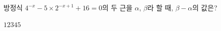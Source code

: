 방정식 $4^{-x}-5\times 2^{-x+1}+16=0$의 두 근을 $\alpha$, $\beta$라 할 때, $\beta-\alpha$의 값은? \cond{$\alpha<\beta$}
\begin{choices32}{$1$}{$2$}{$3$}{$4$}{$5$}\end{choices32}
